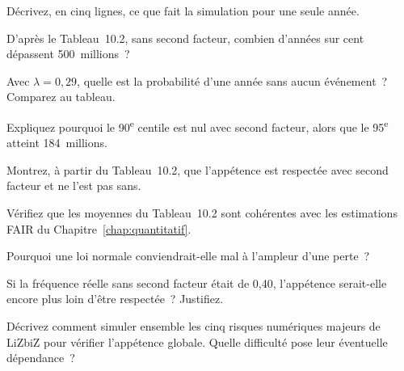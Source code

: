 \begin{boxexo}[title={\ding{45}\quad Exercice~10.1. Les étapes \niveaubase}]
Décrivez, en cinq lignes, ce que fait la simulation pour une seule année.
\end{boxexo}

\begin{boxexo}[title={\ding{45}\quad Exercice~10.2. Lire \niveaubase}]
D'après le Tableau~10.2, sans second facteur, combien d'années sur cent
dépassent 500~millions~?
\end{boxexo}

\begin{boxexo}[title={\ding{45}\quad Exercice~10.3. Poisson \niveaubase}]
Avec $\lambda = 0{,}29$, quelle est la probabilité d'une année sans aucun
événement~? Comparez au tableau.
\end{boxexo}

\begin{boxexo}[title={\ding{45}\quad Exercice~10.4. Le centile nul \niveaumoyen}]
Expliquez pourquoi le 90\textsuperscript{e} centile est nul avec second
facteur, alors que le 95\textsuperscript{e} atteint 184~millions.
\end{boxexo}

\begin{boxexo}[title={\ding{45}\quad Exercice~10.5. L'appétence \niveaumoyen}]
Montrez, à partir du Tableau~10.2, que l'appétence est respectée avec
second facteur et ne l'est pas sans.
\end{boxexo}

\begin{boxexo}[title={\ding{45}\quad Exercice~10.6. Vérifier la moyenne \niveaumoyen}]
Vérifiez que les moyennes du Tableau~10.2 sont cohérentes avec les
estimations FAIR du Chapitre~\ref{chap:quantitatif}.
\end{boxexo}

\begin{boxexo}[title={\ding{45}\quad Exercice~10.7. Pourquoi log-normale \niveaumoyen}]
Pourquoi une loi normale conviendrait-elle mal à l'ampleur d'une perte~?
\end{boxexo}

\begin{boxexo}[title={\ding{45}\quad Exercice~10.8. Sensibilité \niveaumoyen}]
Si la fréquence réelle sans second facteur était de 0,40, l'appétence
serait-elle encore plus loin d'être respectée~? Justifiez.
\end{boxexo}

\begin{boxexo}[title={\ding{45}\quad Exercice~10.9. Plusieurs risques \niveauexpert}]
Décrivez comment simuler ensemble les cinq risques numériques majeurs de
LiZbiZ pour vérifier l'appétence globale. Quelle difficulté pose leur
éventuelle dépendance~?
\end{boxexo}

